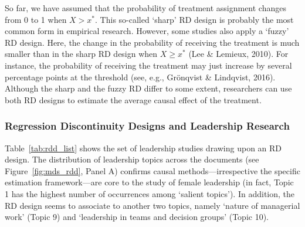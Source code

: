 \documentclass[english]{article}
\begin{document}
So far, we have assumed that the probability of treatment assignment changes
from 0 to 1 when $X > x^{*}$. This so-called `sharp' RD design is
probably the most common form in empirical research. However, some
studies also apply a `fuzzy' RD design. Here, the change in the
probability of receiving the treatment is much smaller than in the sharp
RD design when $X \geq x^{*}$ (Lee \& Lemieux, 2010). For instance,
the probability of receiving the treatment may just increase by several
percentage points at the threshold (see, e.g., Grönqvist \& Lindqvist,
2016). Although the sharp and the fuzzy RD differ to some extent,
researchers can use both RD designs to estimate the average causal
effect of the treatment.


\subsubsection{Regression Discontinuity Designs and Leadership Research}

\noindent Table~\ref{tab:rdd_list} shows the set of leadership studies
drawing upon an RD design. The distribution of leadership
topics across the documents (see Figure~\ref{fig:mds_rdd}, Panel A) confirms
causal methods---irrespective the specific estimation framework---are core to the
study of female leadership (in fact, Topic 1 has the highest number of
occurrences among `salient topics'). In addition, the RD design seems to
associate to another two topics, namely `nature of managerial work'
(Topic 9) and `leadership in teams and decision groups' (Topic 10).
\end{document}
